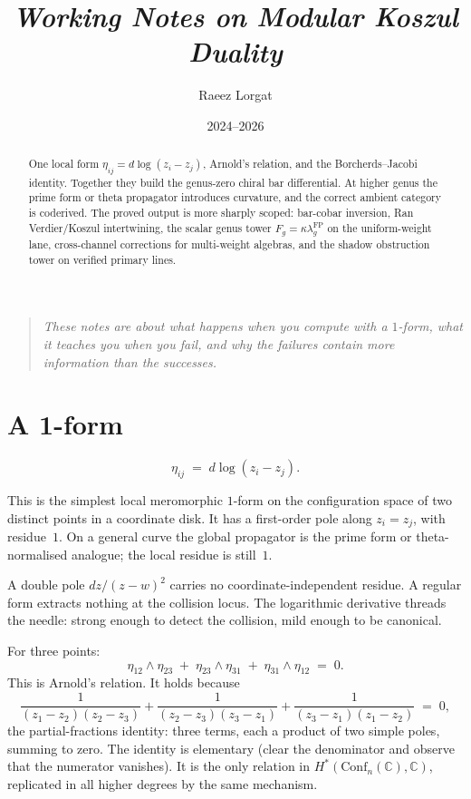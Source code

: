\documentclass[11pt]{article}
\title{\textit{Working Notes on Modular Koszul Duality}}
\author{Raeez Lorgat}
\date{2024--2026}
\newcommand{\C}{\mathbb{C}}
\begin{document}
\maketitle

\begin{abstract}
One local form $\eta_{ij} = d\log(z_i-z_j)$, Arnold's relation,
and the Borcherds--Jacobi identity.  Together they build the
genus-zero chiral bar differential.  At higher genus the prime
form or theta propagator introduces curvature, and the correct
ambient category is coderived.  The proved output is more
sharply scoped: bar-cobar inversion, Ran Verdier/Koszul
intertwining, the scalar genus tower
$F_g=\kappa\lambda_g^{\mathrm{FP}}$ on the uniform-weight lane,
cross-channel corrections for multi-weight algebras, and the
shadow obstruction tower on verified primary lines.
\end{abstract}

\begin{quote}
\itshape
These notes are about what happens when you compute with a
$1$-form, what it teaches you when you fail, and why the failures
contain more information than the successes.
\end{quote}

\tableofcontents


\section{A 1-form}
\label{sec:one-form}

\begin{equation}\label{eq:seed}
\eta_{ij} \;=\; d\log(z_i - z_j).
\end{equation}

This is the simplest local meromorphic $1$-form on the
configuration space of two distinct points in a coordinate disk.
It has a first-order pole along $z_i = z_j$, with residue~$1$.
On a general curve the global propagator is the prime form or
theta-normalised analogue; the local residue is still~$1$.

A double pole $dz/(z-w)^2$ carries no coordinate-independent
residue.  A regular form extracts nothing at the collision locus.
The logarithmic derivative threads the needle: strong enough to
detect the collision, mild enough to be canonical.

For three points:
\begin{equation}\label{eq:arnold}
\eta_{12} \wedge \eta_{23}
\;+\; \eta_{23} \wedge \eta_{31}
\;+\; \eta_{31} \wedge \eta_{12}
\;=\; 0.
\end{equation}
This is Arnold's relation.  It holds because
\[
\frac{1}{(z_1 - z_2)(z_2 - z_3)}
+ \frac{1}{(z_2 - z_3)(z_3 - z_1)}
+ \frac{1}{(z_3 - z_1)(z_1 - z_2)}
\;=\; 0,
\]
the partial-fractions identity: three terms, each a product of two
simple poles, summing to zero.  The identity is elementary (clear the
denominator and observe that the numerator vanishes).  It is the only
relation in $H^*(\mathrm{Conf}_n(\C),\C)$, replicated in all higher
degrees by the same mechanism.
\end{document}
